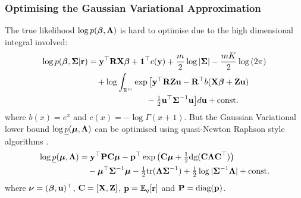 \documentclass{beamer}
\begin{document}
	\begin{frame}
		\frametitle{Optimising the Gaussian Variational Approximation}
		The true likelihood $\log p({\boldsymbol \beta}, {\boldsymbol \Lambda})$ is hard to optimise due 
		to the high dimensional integral involved:
		\begin{align*}
			\log p({\boldsymbol \beta}, {\boldsymbol \Sigma} | {\bf r}) & = {\bf y}^\top {\bf R} {\bf X} {\boldsymbol\beta} + {\bf 1}^\top c({\bf y}) + \frac{m}{2} \log |{\boldsymbol \Sigma}| - \frac{mK}{2} \log{(2 \pi)}    \\
			                               & \quad + \log  \int_{\mathbb{R}^{m}} \exp \big[ {\bf y}^\top {\bf R} {\bf Z} {\bf u} - {\bf R}^\top b( {\bf X} {\boldsymbol \beta} + {\bf Z} {\bf u})   \\
			                               & \quad \quad \quad \quad \quad \quad \quad - \tfrac{1}{2} {{\bf u}^\top {\boldsymbol\Sigma}^{-1} {\bf u} } \big] d {\bf u} + \text{const.} 
		\end{align*}
		where $b(x) = e^x$ and $c(x) = -\log \Gamma(x + 1)$. But the Gaussian Variational lower bound $\log
		\underline{p}({\boldsymbol \mu}, {\boldsymbol \Lambda})$ can be optimised using quasi-Newton Raphson style algorithms 
		\cite{Nocedal2006}.
		\begin{align*}		                                   
			\log \underline{p}({\boldsymbol \mu}, {\boldsymbol \Lambda}) & = {\bf y}^\top {\bf P} {\bf C} {\boldsymbol\mu} - {\bf p}^\top \exp{\left({\bf C}{\boldsymbol\mu}+  \tfrac{1}{2} \mbox{dg}{({\bf C}{\boldsymbol\Lambda}{\bf C}^\top)}\right)}                         \\
			                                   & \quad - {\boldsymbol \mu}^\top {\boldsymbol\Sigma}^{-1} {\boldsymbol \mu} - \tfrac{1}{2} \text{tr}{({\boldsymbol\Lambda}{\boldsymbol\Sigma}^{-1})} + \tfrac{1}{2} \log{|{\boldsymbol\Sigma}^{-1}{\boldsymbol\Lambda}|} + \text{const.} 
		\end{align*}
		where ${\boldsymbol \nu} = ({\boldsymbol \beta}, {\bf u})^\top$, ${\bf C} = [{\bf X}, {\bf Z}]$, ${\bf p} = \mathbb{E}_q[{\bf r}]$ and ${\bf P} = \text{diag}({\bf p})$.
	\end{frame}
			
	\def\checkmark{\tikz\fill[scale=0.4](0,.35) -- (.25,0) -- (1,.7) -- (.25,.15) -- cycle;}
			
\end{document}
